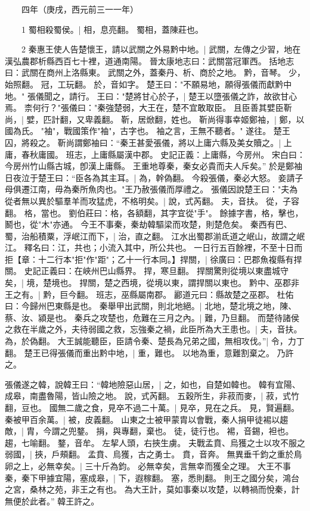 　　四年（庚戌，西元前三一一年）

　　1 蜀相殺蜀侯。|{
	相，息亮翻。
	蜀相，蓋陳莊也。
}

　　2 秦惠王使人告楚懷王，請以武關之外易黔中地。|{
	武關，左傳之少習，地在漢弘農郡析縣西百七十裡，道通南陽。
	晉太康地志曰：武關當冠軍西。
	括地志曰：武關在商州上洛縣東。
	武關之外，蓋秦丹、析、商於之地。
	黔，音琴。
	少，始照翻。
	冠，工玩翻。
	於，音如字。
}
楚王曰："不願易地，願得張儀而獻黔中地。"
張儀聞之，請行。
王曰："楚將甘心於子，|{
	楚王以墮張儀之詐，故欲甘心焉。
}
柰何行？"張儀曰："秦強楚弱，大王在，楚不宜敢取臣。
	且臣善其嬖臣靳尚，|{
	嬖，匹計翻，又卑義翻。
	靳，居焮翻，姓也。
}
靳尚得事幸姬鄭袖，|{
	鄭，以國為氏。
	"袖"，戰國策作"袖"，古字也。
}
袖之言，王無不聽者。"
遂往。
楚王囚，將殺之。
靳尚謂鄭袖曰：“秦王甚愛張儀，將以上庸六縣及美女贖之。|{
	上庸，春秋庸國。
	班志，上庸縣屬漢中郡。
	史記正義：上庸縣，今房州。
	宋白曰：今房州竹山縣古城，卽漢上庸縣。
}
王重地尊秦，秦女必貴而夫人斥矣。”
於是鄭袖日夜泣于楚王曰：“臣各為其主耳。|{
	為，幹偽翻。
}
今殺張儀，秦必大怒。
	妾請子母俱遷江南，毋為秦所魚肉也。"王乃赦張儀而厚禮之。
	張儀因說楚王曰："夫為從者無以異於驅羣羊而攻猛虎，不格明矣。|{
	說，式芮翻。
	夫，音扶。
	從，子容翻。
	格，當也。
	劉伯莊曰：格，各額翻，其字宜從"手"。
	餘據字書，格，擊也，鬭也，從"木"亦通。
}
今王不事秦，秦劫韓驅梁而攻楚，則楚危矣。
秦西有巴、蜀，治船積粟，浮岷江而下，|{
	治，直之翻。
	江水出蜀郡湔氐道之岷山，故謂之岷江。
	釋名曰：江，共也；小流入其中，所公共也。
}
一日行五百餘裡，不至十日而拒【章：十二行本"拒"作"距"；乙十一行本同。】捍關，|{
	徐廣曰：巴郡魚複縣有捍關。
	史記正義曰：在峽州巴山縣界。
	捍，寒旦翻。
}
捍關驚則從境以東盡城守矣，|{
	境，楚境也。
	捍關，楚之西境，從境以東，謂捍關以東也。
}
黔中、巫郡非王之有。|{
	黔，巨今翻。
	班志，巫縣屬南郡。
	酈道元曰：縣故楚之巫郡。
	杜佑曰：今歸州巴東縣是也。
}
秦舉甲出武關，則北地絕。|{
	北地，楚北境之地，陳、蔡、汝、潁是也。
}
秦兵之攻楚也，危難在三月之內。|{
	難，乃旦翻。
}
而楚待諸侯之救在半歲之外，夫待弱國之救，忘強秦之禍，此臣所為大王患也。|{
	夫，音扶。
	為，於偽翻。
}
大王誠能聽臣，臣請令秦、楚長為兄弟之國，無相攻伐。”|{
	令，力丁翻。
}
楚王已得張儀而重出黔中地，|{
	重，難也。
	以地為重，意難割棄之。
}
乃許之。


張儀遂之韓，說韓王曰：“韓地險惡山居，|{
	之，如也，自楚如韓也。
	韓有宜陽、成皋，南盡魯陽，皆山險之地。
	說，式芮翻。
}
五穀所生，非菽而麥，|{
	菽，式竹翻，豆也。
}
國無二歲之食，見卒不過二十萬。|{
	見卒，見在之兵。
	見，賢遍翻。
}
秦被甲百余萬。|{
	被，皮義翻。
}
山東之士被甲蒙胄以會戰，秦人捐甲徒裼以趨敵，|{
	胄，今謂之兜鍪。
	捐，與專翻，棄也。
	徒，徒行也。
	裼，音錫，袒也。
	趨，七喻翻。
	鍪，音牟。
}
左挈人頭，右挾生虜。
	夫戰孟賁、烏獲之士以攻不服之弱國，|{
	挾，戶頰翻。
	孟賁、烏獲，古之勇士。
	賁，音奔。
}
無異垂千鈞之重於鳥卵之上，必無幸矣。|{
	三十斤為鈞。
	必無幸矣，言無幸而獲全之理。
}
大王不事秦，秦下甲據宜陽，塞成皋，|{
	下，遐稼翻。
	塞，悉則翻。
}
則王之國分矣，鴻台之宮，桑林之苑，非王之有也。
為大王計，莫如事秦以攻楚，以轉禍而悅秦，計無便於此者。”
韓王許之。


